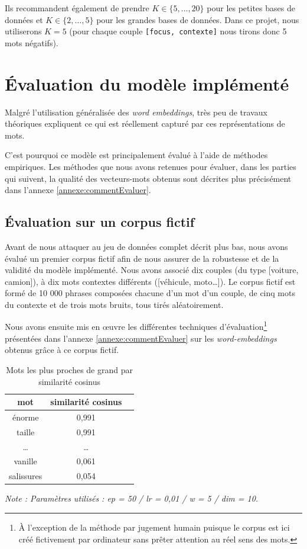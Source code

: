 \documentclass[11pt,french,french]{article}
\let\rmarkdownfootnote\footnote%
\def\footnote{\protect\rmarkdownfootnote}
\begin{document}
Ils recommandent également de prendre \(K\in\{5,\dots,20\}\) pour les petites bases de données et \(K\in\{2,\dots,5\}\) pour les grandes bases de données. Dans ce projet, nous utiliserons \(K=5\) (pour chaque couple \texttt{{[}focus,\ contexte{]}} nous tirons donc 5 mots négatifs).

\hypertarget{sec:evaluation}{%
\section{Évaluation du modèle implémenté}\label{sec:evaluation}}

Malgré l'utilisation généralisée des \emph{word embeddings}, très peu de travaux théoriques expliquent ce qui est réellement capturé par ces représentations de mots.

C'est pourquoi ce modèle est principalement évalué à l'aide de méthodes empiriques.
Les méthodes que nous avons retenues pour évaluer, dans les parties qui suivent, la qualité des vecteurs-mots obtenus sont décrites plus précisément dans l'annexe \ref{annexe:commentEvaluer}.

\hypertarget{sec:corpusFictif}{%
\subsection{Évaluation sur un corpus fictif}\label{sec:corpusFictif}}

Avant de nous attaquer au jeu de données complet décrit plus bas, nous avons évalué un premier corpus fictif afin de nous assurer de la robustesse et de la validité du modèle implémenté. Nous avons associé dix couples (du type {[}voiture, camion{]}), à dix mots contextes différents ({[}véhicule, moto\dots{]}).
Le corpus fictif est formé de 10 000 phrases composées chacune d'un mot d'un couple, de cinq mots du contexte et de trois mots bruits, tous tirés aléatoirement.

Nous avons ensuite mis en œuvre les différentes techniques d'évaluation\footnote{À l'exception de la méthode par \og jugement humain \fg{} puisque le corpus est ici créé fictivement par ordinateur sans prêter attention au réel sens des mots.}
présentées dans l'annexe \ref{annexe:commentEvaluer} sur les \emph{word-embeddings} obtenus grâce à ce corpus fictif.

\begin{table}
\begin{center}
\begin{tabular}{|c|c|c|}
    \hline
    mot & similarité cosinus \tabularnewline
    \hline
    énorme & 0,991   \tabularnewline
    taille & 0,991   \tabularnewline
    \dots & \dots    \tabularnewline
    vanille & 0,061   \tabularnewline
    salissures & 0,054   \tabularnewline
    \hline
 \end{tabular}
\captionsetup{margin=0cm,format=hang,justification=justified}
\caption{Mots les plus proches de \og grand \fg{} par similarité cosinus}\label{table:tableau_evaluation}
\end{center}
\vspace{-0.3cm}
\footnotesize
\emph{Note : Paramètres utilisés : ep = 50 / lr = 0,01 / w = 5 / dim = 10.}
\end{table}
\end{document}

